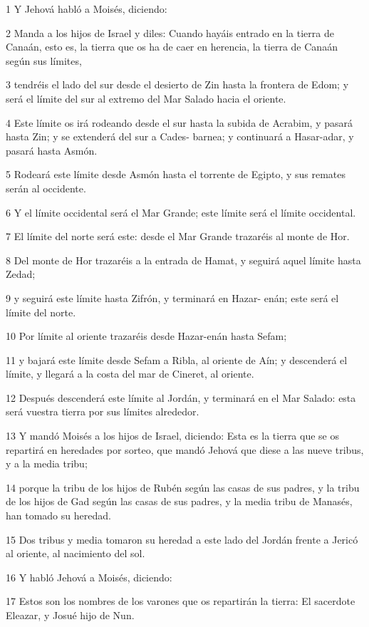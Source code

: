 \par 1 Y Jehová habló a Moisés, diciendo:
\par 2 Manda a los hijos de Israel y diles: Cuando hayáis entrado en la tierra de Canaán, esto es, la tierra que os ha de caer en herencia, la tierra de Canaán según sus límites,
\par 3 tendréis el lado del sur desde el desierto de Zin hasta la frontera de Edom; y será el límite del sur al extremo del Mar Salado hacia el oriente.
\par 4 Este límite os irá rodeando desde el sur hasta la subida de Acrabim, y pasará hasta Zin; y se extenderá del sur a Cades- barnea; y continuará a Hasar-adar, y pasará hasta Asmón.
\par 5 Rodeará este límite desde Asmón hasta el torrente de Egipto, y sus remates serán al occidente.
\par 6 Y el límite occidental será el Mar Grande; este límite será el límite occidental. 
\par 7 El límite del norte será este: desde el Mar Grande trazaréis al monte de Hor.
\par 8 Del monte de Hor trazaréis a la entrada de Hamat, y seguirá aquel límite hasta Zedad;
\par 9 y seguirá este límite hasta Zifrón, y terminará en Hazar- enán; este será el límite del norte. 
\par 10 Por límite al oriente trazaréis desde Hazar-enán hasta Sefam;
\par 11 y bajará este límite desde Sefam a Ribla, al oriente de Aín; y descenderá el límite, y llegará a la costa del mar de Cineret, al oriente.
\par 12 Después descenderá este límite al Jordán, y terminará en el Mar Salado: esta será vuestra tierra por sus límites alrededor.
\par 13 Y mandó Moisés a los hijos de Israel, diciendo: Esta es la tierra que se os repartirá en heredades por sorteo, que mandó Jehová que diese a las nueve tribus, y a la media tribu;
\par 14 porque la tribu de los hijos de Rubén según las casas de sus padres, y la tribu de los hijos de Gad según las casas de sus padres, y la media tribu de Manasés, han tomado su heredad.
\par 15 Dos tribus y media tomaron su heredad a este lado del Jordán frente a Jericó al oriente, al nacimiento del sol.
\par 16 Y habló Jehová a Moisés, diciendo:
\par 17 Estos son los nombres de los varones que os repartirán la tierra: El sacerdote Eleazar, y Josué hijo de Nun.
